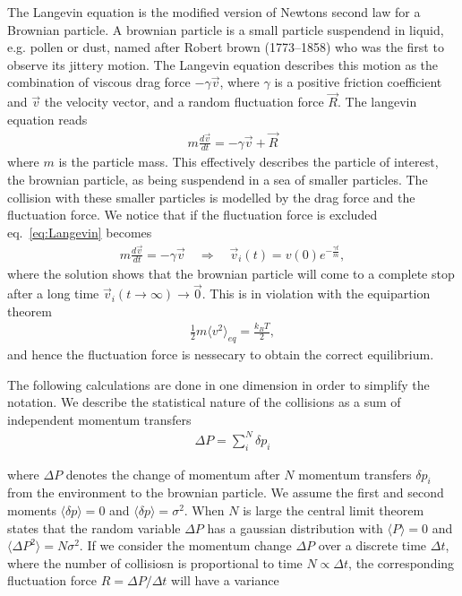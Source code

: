 The Langevin equation is the modified version of Newtons second law for a Brownian particle. A brownian particle is a small particle suspendend in liquid, e.g. pollen or dust, named after Robert brown (1773–1858) who was the first to observe its jittery motion. The Langevin equation describes this motion as the combination of viscous drag force $ -\gamma \vec{v}$, where $\gamma$ is a positive friction coefficient and $\vec{v}$ the velocity vector, and a random fluctuation force $\vec{R}$. The langevin equation reads
\begin{align}
  m \frac{d \vec{v}}{dt} = -\gamma \vec{v} + \vec{R}
  \label{eq:Langevin}
\end{align}
where $m$ is the particle mass. This effectively describes the particle of interest, the brownian particle, as being suspendend in a sea of smaller particles. The collision with these smaller particles is modelled by the drag force and the fluctuation force. We notice that if the fluctuation force is excluded eq.~\eqref{eq:Langevin} becomes 
\begin{align*}
  m \frac{d \vec{v}}{dt} = -\gamma \vec{v} \quad \Rightarrow \quad 
  \vec{v}_i(t) = v(0)e^{- \frac{\gamma t}{m}},
\end{align*}
where the solution shows that the brownian particle will come to a complete stop after a long time ${\vec{v}_i(t\to\infty) \to \vec{0}}$. This is in violation with the equipartion theorem
\begin{align*}
  \frac{1}{2}m\langle v^2 \rangle_{eq} = \frac{k_B T}{2},
\end{align*}
and hence the fluctuation force is nessecary to obtain the correct equilibrium. 

The following calculations are done in one dimension in order to simplify the notation. We describe the statistical nature of the collisions as a sum of independent momentum transfers
\begin{align*}
  \Delta P = \sum_i^N \delta p_i
\end{align*}

where $\Delta P$ denotes the change of momentum after $N$ momentum transfers $\delta p_i$ from the environment to the brownian particle. We assume the first and second moments $\langle \delta p \rangle = 0$ and  $\langle \delta p \rangle = \sigma^2$. When $N$ is large the central limit theorem states that the random variable $\Delta P$ has a gaussian distribution with  $\langle P \rangle = 0$ and $\langle \Delta P^2 \rangle = N\sigma^2$. If we consider the momentum change  $\Delta P$  over a discrete time $\Delta t$, where the number of collisiosn is proportional to time $N \propto \Delta t$, the corresponding fluctuation force $R = \Delta P / \Delta t$ will have a variance 


